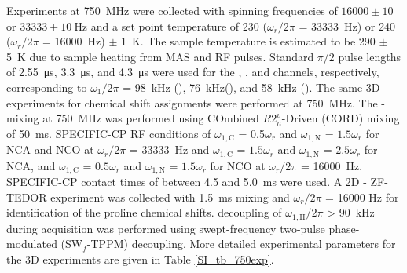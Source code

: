 \documentclass[%
 aip,
 amsmath,amssymb,
 preprint,%
]{revtex4-1}
\begin{document}
Experiments at \SI{750}{\mega\hertz} were collected with spinning frequencies of $16000\pm10$ or $33333\pm\SI{10}{ \hertz}$ and a set point temperature of 230 ($\omega_{r}/2\pi$ = \SI{33333}{\hertz}) or 240 ($\omega_{r}/2\pi$ = \SI{16000}{\hertz}) $\pm$ \SI{1}{\kelvin}. The sample temperature is estimated to be 290 $\pm$ \SI{5}{\kelvin} due to sample heating from MAS and RF pulses.\cite{Zhang2019} Standard $\pi/2$ pulse lengths of \SI{2.55}{\micro\second}, \SI{3.3}{\micro\second}, and \SI{4.3}{\micro\second} were used for the , , and  channels, respectively, corresponding to $\omega_1/2\pi$ = \SI{98}{\kilo\hertz} (), \SI{76}{\kilo\hertz}(), and \SI{58}{\kilo\hertz} (). The same 3D experiments for chemical shift assignments were performed at \SI{750}{\mega\hertz}. The - mixing at \SI{750}{\mega\hertz} was performed using COmbined $R2^v_n$-Driven (CORD) mixing of \SI{50}{\milli\second}.\cite{Hou2013} SPECIFIC-CP RF conditions of $\omega_{1,\text{C}}$ = 0.5$\omega_{r}$ and $\omega_{1,\text{N}}$ = $ 1.5\omega_{r}$ for NCA and NCO at $\omega_{r}/2\pi$ = \SI{33333}{\hertz} and $\omega_{1,\text{C}}$ = $1.5\omega_{r}$ and $\omega_{1,\text{N}}$ = $2.5\omega_{r}$ for NCA, and $\omega_{1,\text{C}}$ = $0.5\omega_{r}$ and $\omega_{1,\text{N}}$ = $1.5\omega_{r}$ for NCO at $\omega_{r}/2\pi$ = \SI{16000 }{\hertz}. SPECIFIC-CP contact times of between 4.5 and \SI{5.0}{\milli\second} were used. A 2D - ZF-TEDOR experiment\cite{Jaroniec2002} was collected with \SI{1.5}{\milli\second} mixing and $\omega_{r}/2\pi$ = 16000 Hz for identification of the proline chemical shifts.  decoupling of $\omega_{1,\text{H}}/2\pi$ > \SI{90}{\kilo\hertz} during acquisition was performed using swept-frequency two-pulse phase-modulated (SW$_f$-TPPM) decoupling.\cite{Thakur2006} More detailed experimental parameters for the 3D experiments are given in Table \ref{SI_tb_750exp}.
\end{document}

